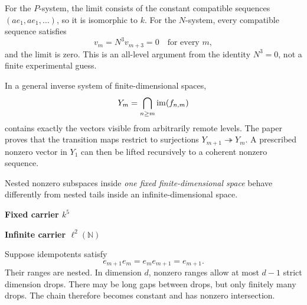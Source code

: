 For the $P$-system, the limit consists of the constant compatible sequences $(a e_1,a e_1,\ldots)$, so it is isomorphic to $k$. For the $N$-system, every compatible sequence satisfies
\[
v_m=N^3v_{m+3}=0\quad\text{for every }m,
\]
and the limit is zero. This is an all-level argument from the identity $N^3=0$, not a finite experimental guess.

In a general inverse system of finite-dimensional spaces,
\[
Y_m=\bigcap_{n\ge m}\operatorname{im}(f_{n,m})
\]
contains exactly the vectors visible from arbitrarily remote levels. The paper proves that the transition maps restrict to surjections $Y_{m+1}\twoheadrightarrow Y_m$. A prescribed nonzero vector in $Y_1$ can then be lifted recursively to a coherent nonzero sequence.


Nested nonzero subspaces inside \emph{one fixed finite-dimensional space} behave differently from nested tails inside an infinite-dimensional space.

\begin{minipage}[t]{.44\linewidth}\centering
{\sffamily\bfseries Fixed carrier $k^5$}\par\vspace{4pt}
\end{minipage}\hfill
\begin{minipage}[t]{.52\linewidth}\centering
{\sffamily\bfseries Infinite carrier $\ell^2(\mathbb N)$}\par\vspace{4pt}
\end{minipage}

Suppose idempotents satisfy
\[
e_{m+1}e_m=e_me_{m+1}=e_{m+1}.
\]
Their ranges are nested. In dimension $d$, nonzero ranges allow at most $d-1$ strict dimension drops. There may be long gaps between drops, but only finitely many drops. The chain therefore becomes constant and has nonzero intersection.

